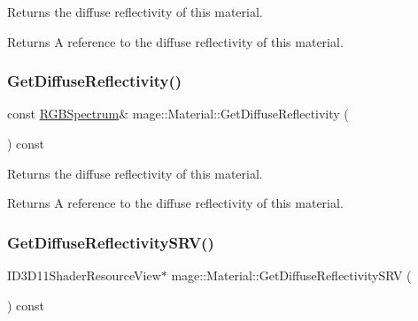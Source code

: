 Returns the diffuse reflectivity of this material.

\begin{DoxyReturn}{Returns}
A reference to the diffuse reflectivity of this material. 
\end{DoxyReturn}
\hypertarget{structmage_1_1_material_a046b0d8eece74bd68538fefd03c1f294}{}\label{structmage_1_1_material_a046b0d8eece74bd68538fefd03c1f294} 
\subsubsection{\texorpdfstring{Get\+Diffuse\+Reflectivity()}{GetDiffuseReflectivity()}\hspace{0.1cm}{\footnotesize\ttfamily [2/2]}}
{\footnotesize\ttfamily const \hyperlink{structmage_1_1_r_g_b_spectrum}{R\+G\+B\+Spectrum}\& mage\+::\+Material\+::\+Get\+Diffuse\+Reflectivity (\begin{DoxyParamCaption}{ }\end{DoxyParamCaption}) const\hspace{0.3cm}{\ttfamily [noexcept]}}

Returns the diffuse reflectivity of this material.

\begin{DoxyReturn}{Returns}
A reference to the diffuse reflectivity of this material. 
\end{DoxyReturn}
\hypertarget{structmage_1_1_material_a20c4db65d5fb89178c0f6b6db2f87cda}{}\label{structmage_1_1_material_a20c4db65d5fb89178c0f6b6db2f87cda} 
\subsubsection{\texorpdfstring{Get\+Diffuse\+Reflectivity\+S\+R\+V()}{GetDiffuseReflectivitySRV()}}
{\footnotesize\ttfamily I\+D3\+D11\+Shader\+Resource\+View$\ast$ mage\+::\+Material\+::\+Get\+Diffuse\+Reflectivity\+S\+RV (\begin{DoxyParamCaption}{ }\end{DoxyParamCaption}) const\hspace{0.3cm}{\ttfamily [noexcept]}}

